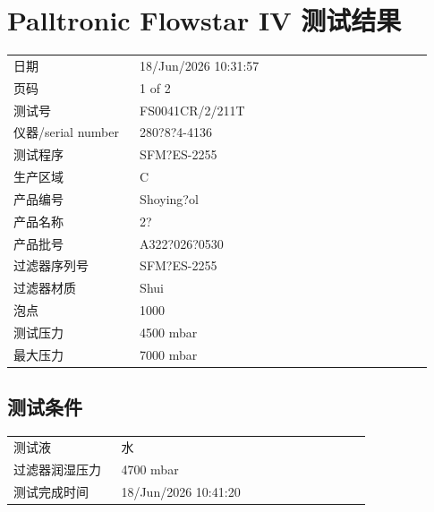 \documentclass[UTF8,10pt,a4paper,fontset=fandol]{ctexart}
\newcommand{\fieldvalue}[1]{#1}
\begin{document}
\newpage

\section*{Palltronic Flowstar IV 测试结果}

\begin{tabular}{@{}p{0.28\linewidth}p{0.65\linewidth}@{}}
日期 &
\fieldvalue{18/Jun/2026 10:31:57}
\\
页码 &
\fieldvalue{1 of 2}
\\
测试号 &
\fieldvalue{FS0041CR/2/211T}
\\
仪器/serial number &
\fieldvalue{280?8?4-4136}
\\
测试程序 &
\fieldvalue{SFM?ES-2255}
\\
生产区域 &
\fieldvalue{C}
\\
产品编号 &
\fieldvalue{Shoying?ol}
\\
产品名称 &
\fieldvalue{2?}
\\
产品批号 &
\fieldvalue{A322?026?0530}
\\
过滤器序列号 &
\fieldvalue{SFM?ES-2255}
\\
过滤器材质 &
\fieldvalue{Shui}
\\
泡点 &
\fieldvalue{1000}
\\
测试压力 &
\fieldvalue{4500 mbar}
\\
最大压力 &
\fieldvalue{7000 mbar}
\end{tabular}

\subsection*{测试条件}

\begin{tabular}{@{}p{0.28\linewidth}p{0.65\linewidth}@{}}
测试液 &
\fieldvalue{水}
\\
过滤器润湿压力 &
\fieldvalue{4700 mbar}
\\
测试完成时间 &
\fieldvalue{18/Jun/2026 10:41:20}
\end{tabular}
\end{document}
